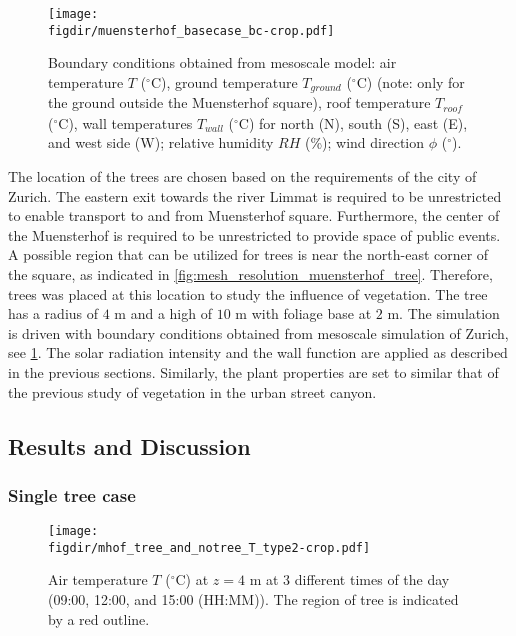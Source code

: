 \begin{figure}[p]
	\centering
	\texttt{[image: \\figdir/muensterhof\_basecase\_bc-crop.pdf]}
	\caption{Boundary conditions obtained from mesoscale model:  air temperature $T$ ($^{\circ}$C), ground temperature $T_{\textit{ground}}$ ($^{\circ}$C) (note: only for the ground outside the Muensterhof square), roof temperature $T_{\textit{roof}}$ ($^{\circ}$C), wall temperatures $T_{\textit{wall}}$ ($^{\circ}$C) for north (N), south (S), east (E), and west side (W);  relative humidity $RH$ (\%);  wind direction $\phi$ ($^{\circ}$). }
	\label{fig:muensterhof_bc}
\end{figure}


The location of the trees are chosen based on the requirements of the city of Zurich. The eastern exit towards the river Limmat is required to be unrestricted to enable transport to and from Muensterhof square. Furthermore, the center of the Muensterhof is required to be unrestricted to provide space of public events. A possible region that can be utilized for trees is near the north-east corner of the square, as indicated in \cref{fig:mesh_resolution_muensterhof_tree}. Therefore, trees was placed at this location to study the influence of vegetation. The tree has a radius of $4$ m and a high of $10$ m with foliage base at $2$ m. The simulation is driven with boundary conditions obtained from mesoscale simulation of Zurich, see \cref{fig:muensterhof_bc}. The solar radiation intensity and the wall function are applied as described in the previous sections. Similarly, the plant properties are set to similar that of the previous study of vegetation in the urban street canyon. 

\subsection{Results and Discussion}

\subsubsection{Single tree case}

\begin{figure}[p]
	\centering
	\texttt{[image: \\figdir/mhof\_tree\_and\_notree\_T\_type2-crop.pdf]}
	\caption{Air temperature $T$ ($^{\circ}$C) at $z=4$ m at 3 different times of the day (09:00, 12:00, and 15:00 (HH:MM)). The region of tree is indicated by a red outline.}
	\label{fig:T_muensterhof}
\end{figure}


